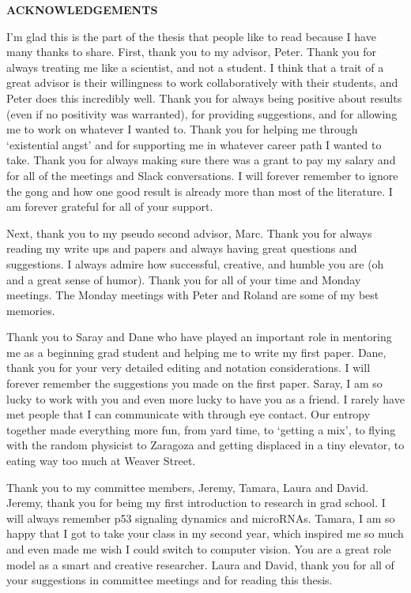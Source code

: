 
\begin{center}
\vspace*{52pt}
{\Large \textbf{ACKNOWLEDGEMENTS}}
\end{center}

I'm glad this is the part of the thesis that people like to read because I have many thanks to share. First, thank you to my advisor, Peter. Thank you for always treating me like a scientist, and not a student. I think that a trait of a great advisor is their willingness to work collaboratively with their students, and Peter does this incredibly well. Thank you for always being positive about results (even if no positivity was warranted), for providing suggestions, and for allowing me to work on whatever I wanted to. Thank you for helping me through `existential angst' and for supporting me in whatever career path I wanted to take. Thank you for always making sure there was a grant to pay my salary and for all of the meetings and Slack conversations. I will forever remember to ignore the gong and how one good result is already more than most of the literature. I am forever grateful for all of your support.

Next, thank you to my pseudo second advisor, Marc. Thank you for always reading my write ups and papers and always having great questions and suggestions. I always admire how successful, creative, and humble you are (oh and a great sense of humor). Thank you for all of your time and Monday meetings. The Monday meetings with Peter and Roland are some of my best memories. 

Thank you to Saray and Dane who have played an important role in mentoring me as a beginning grad student and helping me to write my first paper. Dane, thank you for your very detailed editing and notation considerations. I will forever remember the suggestions you made on the first paper. Saray, I am so lucky to work with you and even more lucky to have you as a friend. I rarely have met people that I can communicate with through eye contact. Our entropy together made everything more fun, from yard time, to `getting a mix', to flying with the random physicist to Zaragoza and getting displaced in a tiny elevator, to eating way too much at Weaver Street. 

Thank you to my committee members, Jeremy, Tamara, Laura and David. Jeremy, thank you for being my first introduction to research in grad school. I will always remember p53 signaling dynamics and microRNAs. Tamara, I am so happy that I got to take your class in my second year, which inspired me so much and even made me wish I could switch to computer vision. You are a great role model as a smart and creative researcher. Laura and David, thank you for all of your suggestions in committee meetings and for reading this thesis.

